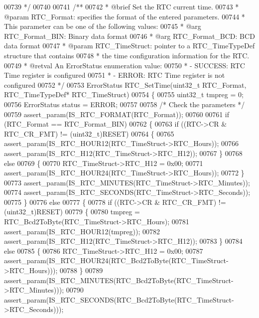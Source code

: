 \begin{DoxyCode}
00739 \textcolor{comment}{  */}
00740 
00741 \textcolor{comment}{/**}
00742 \textcolor{comment}{  * @brief  Set the RTC current time.}
00743 \textcolor{comment}{  * @param  RTC\_Format: specifies the format of the entered parameters.}
00744 \textcolor{comment}{  *          This parameter can be  one of the following values:}
00745 \textcolor{comment}{  *            @arg RTC\_Format\_BIN:  Binary data format }
00746 \textcolor{comment}{  *            @arg RTC\_Format\_BCD:  BCD data format}
00747 \textcolor{comment}{  * @param  RTC\_TimeStruct: pointer to a RTC\_TimeTypeDef structure that contains }
00748 \textcolor{comment}{  *                        the time configuration information for the RTC.     }
00749 \textcolor{comment}{  * @retval An ErrorStatus enumeration value:}
00750 \textcolor{comment}{  *          - SUCCESS: RTC Time register is configured}
00751 \textcolor{comment}{  *          - ERROR: RTC Time register is not configured}
00752 \textcolor{comment}{  */}
00753 ErrorStatus RTC_SetTime(uint32\_t RTC\_Format, RTC\_TimeTypeDef* RTC\_TimeStruct)
00754 \{
00755   uint32\_t tmpreg = 0;
00756   ErrorStatus status = ERROR;
00757 
00758   \textcolor{comment}{/* Check the parameters */}
00759   assert_param(IS\_RTC\_FORMAT(RTC\_Format));
00760 
00761   \textcolor{keywordflow}{if} (RTC\_Format == RTC_Format_BIN)
00762   \{
00763     \textcolor{keywordflow}{if} ((RTC->CR & RTC_CR_FMT) != (uint32\_t)RESET)
00764     \{
00765       assert_param(IS\_RTC\_HOUR12(RTC\_TimeStruct->RTC\_Hours));
00766       assert_param(IS\_RTC\_H12(RTC\_TimeStruct->RTC\_H12));
00767     \}
00768     \textcolor{keywordflow}{else}
00769     \{
00770       RTC\_TimeStruct->RTC\_H12 = 0x00;
00771       assert_param(IS\_RTC\_HOUR24(RTC\_TimeStruct->RTC\_Hours));
00772     \}
00773     assert_param(IS\_RTC\_MINUTES(RTC\_TimeStruct->RTC\_Minutes));
00774     assert_param(IS\_RTC\_SECONDS(RTC\_TimeStruct->RTC\_Seconds));
00775   \}
00776   \textcolor{keywordflow}{else}
00777   \{
00778     \textcolor{keywordflow}{if} ((RTC->CR & RTC_CR_FMT) != (uint32\_t)RESET)
00779     \{
00780       tmpreg = RTC\_Bcd2ToByte(RTC\_TimeStruct->RTC\_Hours);
00781       assert_param(IS\_RTC\_HOUR12(tmpreg));
00782       assert_param(IS\_RTC\_H12(RTC\_TimeStruct->RTC\_H12));
00783     \}
00784     \textcolor{keywordflow}{else}
00785     \{
00786       RTC\_TimeStruct->RTC\_H12 = 0x00;
00787       assert_param(IS\_RTC\_HOUR24(RTC\_Bcd2ToByte(RTC\_TimeStruct->RTC\_Hours)));
00788     \}
00789     assert_param(IS\_RTC\_MINUTES(RTC\_Bcd2ToByte(RTC\_TimeStruct->RTC\_Minutes)));
00790     assert_param(IS\_RTC\_SECONDS(RTC\_Bcd2ToByte(RTC\_TimeStruct->RTC\_Seconds)));

\end{DoxyCode}
